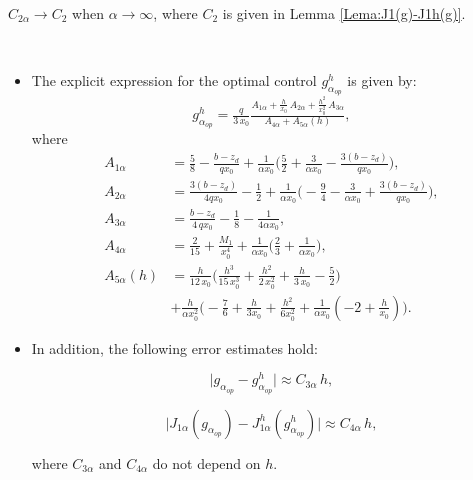 \documentclass[axioms,article,submit,moreauthors]{Definitions/mdpi}
\begin{document}
\begin{Remark} 
 $C_{2\alpha}\to C_2$ when $\alpha\to \infty$, where $C_2$ is given in Lemma \ref{Lema:J1(g)-J1h(g)}.
\end{Remark}

   \begin{Lemma} $ $
   
    
    \begin{itemize}
     \item[(a)] The explicit expression for the optimal { control $g^h_{\alpha_{op}}$} is given by: 
      \begin{equation}\label{galphaoph}
     {g^h_{\alpha_{op}}} = \tfrac{q}{3\,x_0} \tfrac{A_{1\alpha} + \tfrac{h}{x_0}\,A_{2\alpha} + \tfrac{h^2}{x_0^2}\, A_{3\alpha}}{A_{4\alpha} + A_{5\alpha}(h)},
      \end{equation}
  where
\begin{equation}\label{Aialpha}
\begin{array}{rl}
A_{1\alpha}&=\tfrac{5}{8} - \tfrac{b- z_d}{qx_0}+\tfrac{1}{\alpha x_0}\bigg(\tfrac{5}{2}+\tfrac{3}{\alpha x_0}-\tfrac{3(b-z_d)}{ q x_0}\bigg), \\[0.35cm]
 A_{2\alpha}&=\tfrac{3 (b-z_d)}{4 q x_0}  -\tfrac{1}{2}+\tfrac{1}{\alpha x_0}\bigg(-\tfrac{9}{4}-\tfrac{3}{\alpha x_0}+\tfrac{3(b-z_d)}{qx_0} \bigg),  \\[0.35cm]
  A_{3\alpha}&=  \tfrac{b-z_d}{4\,qx_0} - \tfrac{1}{8}-\tfrac{1}{4\alpha x_0}, \\[0.35cm] 
   A_{4\alpha} &= \tfrac{2}{15} + \tfrac{M_1}{x_0^4}+\tfrac{1}{\alpha x_0}\bigg( \tfrac{2}{3}+\tfrac{1}{\alpha x_0}\bigg),\\[0.35cm]
   A_{5\alpha}(h) &=  \tfrac{h}{12\,x_0} \Big( \tfrac{h^3}{15\, x_0^3} + \tfrac{h^2}{2 \, x_0^2} + \tfrac{h}{3\,x_0} - \tfrac{5}{2} \Big)\\
    &+\tfrac{h}{\alpha x_0^2}\bigg( -\tfrac{7}{6}+\tfrac{h}{3x_0}+\tfrac{h^2}{6x_0^2}+\tfrac{1}{\alpha x_0}\left( -2+\tfrac{h}{x_0}\right)\bigg).
\end{array}
\end{equation}  	  
    
     \item[(b)]In addition, the following error estimates hold:

  \begin{equation}\label{resta ghalphaop-galphaop}
    				      \lvert g_{\alpha_{op}} -      {g^h_{\alpha_{op}}}\rvert \approx C_{3\alpha} \, h, 
    				  \end{equation}
    
\begin{equation}\label{dif J1alpha}
    				     \Big \lvert J_{1\alpha}(g_{\alpha_{op}}) -      { J_{1\alpha}^h(g^h_{\alpha_{op}})} \Big \rvert \approx C_{4\alpha} \, h ,
    				\end{equation}
    
    where  $C_{3\alpha}$  and $C_{4\alpha}$ do not depend on  $h$.
   
    \end{itemize}
    \end{Lemma}
    
\end{document}
